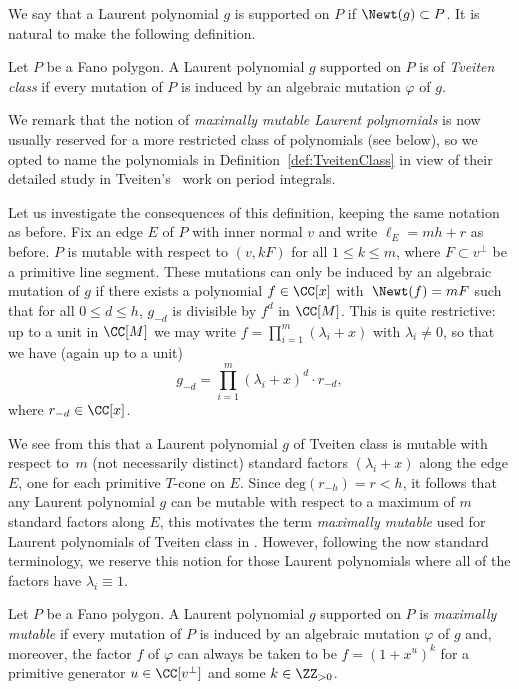 We say that a Laurent polynomial $g$ is supported on $P$ if	$\Newt(g) \subset P$.
It is natural to make the following definition.

	\begin{Definition}\label{def:TveitenClass}
Let $P$ be a Fano polygon. A Laurent polynomial $g$ supported on $P$ is of \emph{Tveiten class} if every mutation of $P$ is induced by an algebraic mutation $\varphi$ of $g$.
	\end{Definition}
We remark that the notion of \emph{maximally mutable Laurent polynomials} is now usually reserved for a more restricted class of polynomials (see below), so we opted to name the polynomials in Definition~\ref{def:TveitenClass} in view of their detailed study in Tveiten's~\cite{Tveiten} work on period integrals.

	Let us investigate the consequences of this definition, keeping the same notation as before. Fix an edge $E$ of $P$ with inner normal $v$ and write $\ell_E=mh+r$ as before. $P$ is mutable with respect to $(v, kF)$ for all $1 \leq k \leq m$, where $F \subset v^\perp$ be a primitive line segment.
	These mutations can only be induced by an algebraic mutation of $g$
	if there exists a polynomial $f \in \CC[x]$ with~${\Newt(f)=mF}$ such that for all $0 \leq d \leq h$, $g_{-d}$ is divisible by $f^d$ in $\CC[M]$. This is quite restrictive: up to a unit in $\CC[M]$ we may write
	$f=\prod_{i=1}^{m} (\lambda_i + x)$ with $\lambda_i \neq 0$, so that we have (again up to a unit)
	\[
	g_{-d}=\prod_{i=1}^{m} (\lambda_i + x)^{d} \cdot r_{-d},
	\]
	 where $r_{-d} \in \CC[x]$.

	 We see from this that a Laurent polynomial $g$ of Tveiten class is mutable with respect to~$m$ (not necessarily distinct) standard factors $(\lambda_i + x)$ along the edge $E$, one for each primitive $T$-cone on $E$.
	Since $\text{deg}(r_{-h})=r<h$, it follows that any Laurent polynomial $g$ can be mutable with respect to a maximum of $m$ standard factors along $E$, this motivates the term \emph{maximally mutable} used for Laurent polynomials of Tveiten class in \cite{Tveiten}. However, following the now standard terminology, we reserve this notion for those Laurent polynomials where all of the factors have $\lambda_i \equiv 1$.
	
	\begin{Definition}\label{def:MMLP}
		Let $P$ be a Fano polygon. A Laurent polynomial $g$ supported on $P$ is \emph{maximally mutable} if every mutation of $P$ is induced by an algebraic mutation $\varphi$ of $g$ and, moreover, the factor $f$ of $\varphi$ can always be taken to be $f=(1+x^u)^k$ for a primitive generator $u \in \CC [v^\perp ]$ and some $k\in \ZZ_{>0}$.
	\end{Definition}

